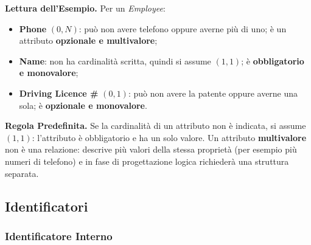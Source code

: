 \documentclass[12pt]{extarticle}
\begin{document}
\begin{center}
\end{center}

\medskip
\noindent \textbf{Lettura dell'Esempio.} Per un \textit{Employee}:
\begin{itemize}
    \item \textbf{Phone} $(0,N)$: può non avere telefono oppure averne più di uno; è un attributo \textbf{opzionale e multivalore};
    \item \textbf{Name}: non ha cardinalità scritta, quindi si assume $(1,1)$; è \textbf{obbligatorio e monovalore};
    \item \textbf{Driving Licence \#} $(0,1)$: può non avere la patente oppure averne una sola; è \textbf{opzionale e monovalore}.
\end{itemize}

\medskip
\noindent \textbf{Regola Predefinita.} Se la cardinalità di un attributo non è indicata, si assume \textbf{$(1,1)$}: l'attributo è obbligatorio e ha un solo valore. Un attributo \textbf{multivalore} non è una relazione: descrive più valori della stessa proprietà (per esempio più numeri di telefono) e in fase di progettazione logica richiederà una struttura separata.

\subsection{Identificatori}

\subsubsection{Identificatore Interno}
\end{document}

